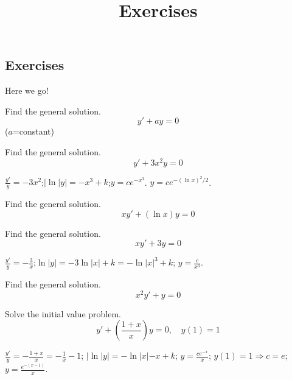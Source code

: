 \documentclass{ximera}
\title{Exercises} \license{CC BY-NC-SA 4.0}
\begin{document}
\begin{abstract}
\end{abstract}
\maketitle

\begin{onlineOnly}
\section*{Exercises}
\end{onlineOnly}

Here we go!

\begin{problem}\label{exer:2.1.1} Find the general solution.
$$y'+ay=0$$
($a$=constant)
\end{problem}

\begin{problem}\label{exer:2.1.2} Find the general solution.
   $$y'+3x^2y=0$$ 



\begin{solution}
    $\frac{y'}{y}=-3x^2$;\quad $|\ln|y|=-x^3+k$;\quad $y=ce^{-x^3}$.
$y=ce^{-(\ln x)^2/2}$.
\end{solution}
\end{problem}

\begin{problem}\label{exer:2.1.3} Find the general solution.
$$xy'+(\ln x)y=0$$
\end{problem}

\begin{problem}\label{exer:2.1.4} Find the general solution.
$$xy'+3y=0$$



\begin{solution}
    $\frac{y'}{y}=-\frac{3}{x}$;\quad $\ln|y|=-3\ln|x|+k=-\ln|x|^3+k$;\quad
$y=\frac{c}{x^3}$.
\end{solution}
\end{problem}

\begin{problem}\label{exer:2.1.5} Find the general solution.
$$x^2y'+y=0$$ 
\end{problem}

 \begin{problem}\label{exer:2.1.6} Solve
the initial value problem.
$$y'+\left(\frac{1+x}{x}\right)y=0,\quad y(1)=1$$



\begin{solution}
    $\frac{y'}{y}=-\frac{1+x}{x}=-\frac{1}{x}-1$;\quad
$|\ln|y|=-\ln|x|-x+k$;\quad
$y=\frac{ce^{-x}}{x}$;\quad
$y(1)=1\Rightarrow
 c=e$;\quad
$y=\frac{e^{-(x-1)}}{x}$.
\end{solution}
\end{problem}
\end{document}
